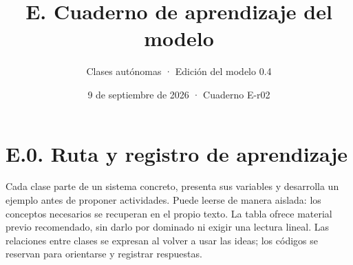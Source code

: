 \documentclass[
  spanish,
  10pt,
  a4paper,
]{article}
\title{E. Cuaderno de aprendizaje del modelo}
\subtitle{Clases autónomas · Edición del modelo 0.4}
\author{}
\date{9 de septiembre de 2026 · Cuaderno E-r02}
\begin{document}
\maketitle

{
\setcounter{tocdepth}{1}
\tableofcontents
}
\newpage

\setlength{\parskip}{4pt plus 1pt}

\section{E.0. Ruta y registro de
aprendizaje}\label{e.0.-ruta-y-registro-de-aprendizaje}

Cada clase parte de un sistema concreto, presenta sus variables y
desarrolla un ejemplo antes de proponer actividades. Puede leerse de
manera aislada: los conceptos necesarios se recuperan en el propio
texto. La tabla ofrece material previo recomendado, sin darlo por
dominado ni exigir una lectura lineal. Las relaciones entre clases se
expresan al volver a usar las ideas; los códigos se reservan para
orientarse y registrar respuestas.
\end{document}
